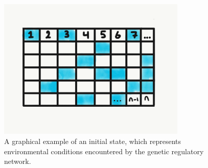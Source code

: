 \begin{figure}
    \centering
    \includegraphics[width=0.8\textwidth]{img/initial_state}
 	\captionsetup{singlelinecheck=off,justification=raggedright}
  	\caption{A graphical example of an initial state, which represents environmental conditions encountered by the genetic regulatory network.}
    \label{fig:initial_state}
\end{figure}